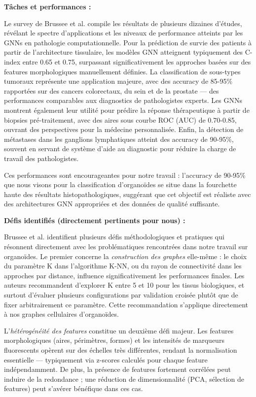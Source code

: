 \textbf{Tâches et performances :}

Le survey de Brussee et al. compile les résultats de plusieurs dizaines d'études, révélant le spectre d'applications et les niveaux de performance atteints par les GNNs en pathologie computationnelle. Pour la prédiction de survie des patients à partir de l'architecture tissulaire, les modèles GNN atteignent typiquement des C-index entre 0.65 et 0.75, surpassant significativement les approches basées sur des features morphologiques manuellement définies. La classification de sous-types tumoraux représente une application majeure, avec des accuracy de 85-95\% rapportées sur des cancers colorectaux, du sein et de la prostate — des performances comparables aux diagnostics de pathologistes experts. Les GNNs montrent également leur utilité pour prédire la réponse thérapeutique à partir de biopsies pré-traitement, avec des aires sous courbe ROC (AUC) de 0.70-0.85, ouvrant des perspectives pour la médecine personnalisée. Enfin, la détection de métastases dans les ganglions lymphatiques atteint des accuracy de 90-95\%, souvent en servant de système d'aide au diagnostic pour réduire la charge de travail des pathologistes.

Ces performances sont encourageantes pour notre travail : l'accuracy de 90-95\% que nous visons pour la classification d'organoïdes se situe dans la fourchette haute des résultats histopathologiques, suggérant que cet objectif est réaliste avec des architectures GNN appropriées et des données de qualité suffisante.

\textbf{Défis identifiés (directement pertinents pour nous) :}

Brussee et al. identifient plusieurs défis méthodologiques et pratiques qui résonnent directement avec les problématiques rencontrées dans notre travail sur organoïdes. Le premier concerne la \textit{construction des graphes} elle-même : le choix du paramètre K dans l'algorithme K-NN, ou du rayon de connectivité dans les approches par distance, influence significativement les performances finales. Les auteurs recommandent d'explorer K entre 5 et 10 pour les tissus biologiques, et surtout d'évaluer plusieurs configurations par validation croisée plutôt que de fixer arbitrairement ce paramètre. Cette recommandation s'applique directement à nos graphes cellulaires d'organoïdes.

L'\textit{hétérogénéité des features} constitue un deuxième défi majeur. Les features morphologiques (aires, périmètres, formes) et les intensités de marqueurs fluorescents opèrent sur des échelles très différentes, rendant la normalisation essentielle — typiquement via z-scores calculés pour chaque feature indépendamment. De plus, la présence de features fortement corrélées peut induire de la redondance ; une réduction de dimensionnalité (PCA, sélection de features) peut s'avérer bénéfique dans ces cas.

